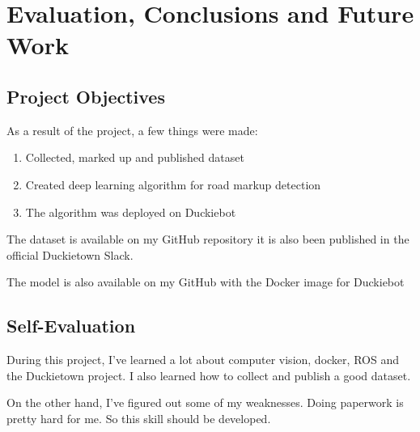 \section{Evaluation, Conclusions and Future Work}
\subsection{Project Objectives}
As a result of the project, a few things were made:
\begin{enumerate}
    \item Collected, marked up and published dataset
    \item Created deep learning algorithm for road markup detection
    \item The algorithm was deployed on Duckiebot
\end{enumerate}

The dataset is available on my GitHub repository it is also been published in the official Duckietown Slack. 

The model is also available on my GitHub with the Docker image for Duckiebot

\subsection{Self-Evaluation}
During this project, I've learned a lot about computer vision, docker, ROS and the Duckietown project. I also learned how to collect and publish a good dataset.

On the other hand, I've figured out some of my weaknesses. Doing paperwork is pretty hard for me. So this skill should be developed.

